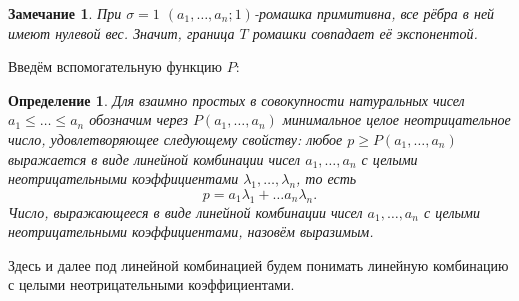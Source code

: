 \documentclass[12pt]{article}
\newtheorem{definition}[theorem]{Определение}
\newtheorem{remark}[theorem]{Замечание}
\begin{document}
\begin{remark}
\label{rmrk:expAndT}
При $\sigma = 1$ $(a_1, \dots, a_n; 1)$-ромашка примитивна, все рёбра в ней имеют нулевой вес. Значит, граница $T$ ромашки совпадает её экспонентой.
\end{remark}

Введём вспомогательную функцию $P$:
\begin{definition}
Для взаимно простых в совокупности натуральных чисел $a_1 \le \dots \le a_n$ обозначим через $P(a_1, \dots, a_n)$ минимальное целое неотрицательное число, удовлетворяющее следующему свойству: любое $p \ge P(a_1, \dots, a_n)$ выражается в виде линейной комбинации чисел $a_1, \dots, a_n$ с целыми неотрицательными коэффициентами $\lambda_1, \dots, \lambda_n$, то есть
\begin{equation}
\label{LK}
p = a_1 \lambda_1 + \dots a_n \lambda_n.
\end{equation}
Число, выражающееся в виде линейной комбинации чисел $a_1, \dots, a_n$ с целыми \\ неотрицательными коэффициентами, назовём выразимым.
\end{definition}

Здесь и далее под линейной комбинацией будем понимать линейную комбинацию с целыми неотрицательными коэффициентами.
\end{document}
